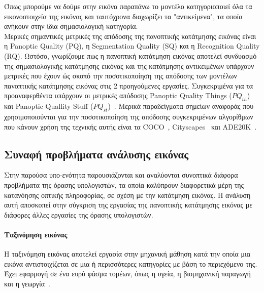 \documentclass[12pt]{article}
\numberwithin{equation}{section}
\begin{document}
Όπως μπορούμε να δούμε στην εικόνα παραπάνω το μοντέλο κατηγοριοποιεί όλα τα εικονοστοιχεία της εικόνας και ταυτόχρονα διαχωρίζει τα "αντικείμενα", τα οποία ανήκουν στην ίδια σημασιολογική κατηγορία. \\

Μερικές σημαντικές μετρικές της απόδοσης της πανοπτικής κατάτμησης εικόνας είναι η Panoptic Quality (PQ), η Segmentation Quality (SQ) και η Recognition Quality (RQ). Ωστόσο, γνωρίζουμε πως η πανοπτική κατάτμηση εικόνας αποτελεί συνδυασμό της σημασιολογικής κατάτμησης εικόνας και της κατάτμησης αντικειμένων υπάρχουν μετρικές που έχουν ώς σκοπό την ποσοτικοποίηση της απόδοσης των μοντέλων πανοπτικής κατάτμησης εικόνας στις 2 προηγούμενες εργασίες. Συγκεκριμένα για τα προαναφερθέντα υπάρχουν οι μετρικές απόδοσης Panoptic Quality Things (\(PQ_{th}\)) και Panoptic Quallity Stuff (\(PQ_{st}\))~\cite{elharrouss2021panopticsegmentationreview}. Μερικά παραδείγματα σημείων αναφοράς που χρησιμοποιούνται για την ποσοτικοποίηση της απόδοσης συγκεκριμένων αλγορίθμων που κάνουν χρήση της τεχνικής αυτής είναι τα COCO~\cite{lin2015microsoftcococommonobjects}, Cityscapes~\cite{DBLP:journals/corr/CordtsORREBFRS16} και ADE20K~\cite{8100027}.

\subsection{Συναφή προβλήματα ανάλυσης εικόνας}

Στην παρούσα υπο-ενότητα παρουσιάζονται και αναλύονται συνοπτικά διάφορα προβλήματα της όρασης υπολογιστών, τα οποία καλύπρουν διαφορετικά μέρη της κατανόησης οπτικής πληροφορίας, σε σχέση με την κατάτμηση εικόνας. Η ανάλυση αυτή αποσκοπεί στην σύγκριση της εργασίας της πανοπτικής κατάτμησης εικόνας με διάφορες άλλες εργασίες της όρασης υπολογιστών.\\ 

\paragraph{Ταξινόμηση εικόνας \\ [0.5 cm]}

Η ταξινόμηση εικόνας αποτελεί εργασία στην μηχανική μάθηση κατά την οποία μια εικόνα αντιστοιχίζεται σε μια ή περισσότερες κατηγορίες με βάση το περιεχόμενο της. Έχει εφαρμογή σε ένα ευρύ φάσμα τομέων, όπως η υγεία, η βιομηχανική παραγωγή και η γεωργία~\cite{onix_image_classification_2024}.\\
\end{document}
